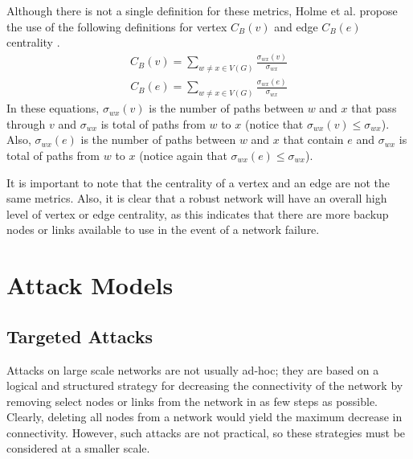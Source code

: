 \documentclass[doc]{apa}%
\begin{document}
Although there is not a single definition for these metrics, Holme et al. propose the use of the following definitions for vertex $C_{B}(v)$ and edge $C_{B}(e)$ centrality \cite{Attacks}.
\begin{eqnarray}
C_{B}(v) = \sum_{w \not= x \in V(G)} \frac{\sigma_{wx}(v)}{\sigma_{wx}}
\end{eqnarray}
\begin{eqnarray}
C_{B}(e) = \sum_{w \not= x \in V(G)} \frac{\sigma_{wx}(e)}{\sigma_{wx}}
\end{eqnarray}
In these equations, $\sigma_{wx}(v)$ is the number of paths between $w$ and $x$ that pass through $v$ and $\sigma_{wx}$ is total of paths from $w$ to $x$ (notice that $\sigma_{wx}(v) \leq \sigma_{wx}$). Also, $\sigma_{wx}(e)$ is the number of paths between $w$ and $x$ that contain $e$ and $\sigma_{wx}$ is total of paths from $w$ to $x$ (notice again that $\sigma_{wx}(e) \leq \sigma_{wx}$).

It is important to note that the centrality of a vertex and an edge are not the same metrics. Also, it is clear that a robust network will have an overall high level of vertex or edge centrality, as this indicates that there are more backup nodes or links available to use in the event of a network failure.



\section{Attack Models}
\label{AttackStrategies}

\subsection{Targeted Attacks}
Attacks on large scale networks are not usually ad-hoc; they are based on a logical and structured strategy for decreasing the connectivity of the network by removing select nodes or links from the network in as few steps as possible. Clearly, deleting all nodes from a network would yield the maximum decrease in connectivity. However, such attacks are not practical, so these strategies must be considered at a smaller scale. 
\end{document}
